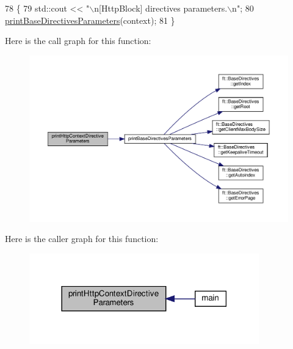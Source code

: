 \begin{DoxyCode}
78     \{
79         std::cout << \textcolor{stringliteral}{"\(\backslash\)n[HttpBlock] directives parameters.\(\backslash\)n"};
80         \hyperlink{namespaceft_af12105e484dbac115fe1d6a4ff074f27}{printBaseDirectivesParameters}(context);
81     \}
\end{DoxyCode}
Here is the call graph for this function\+:
\nopagebreak
\begin{figure}[H]
\begin{center}
\leavevmode
\includegraphics[width=350pt]{namespaceft_a227dfbe1be478e0415b853df46dec985_cgraph}
\end{center}
\end{figure}
Here is the caller graph for this function\+:
\nopagebreak
\begin{figure}[H]
\begin{center}
\leavevmode
\includegraphics[width=282pt]{namespaceft_a227dfbe1be478e0415b853df46dec985_icgraph}
\end{center}
\end{figure}
\mbox{\label{namespaceft_a0036b0ebdedb1a1a1956f4ac3fafdbc4}} 
